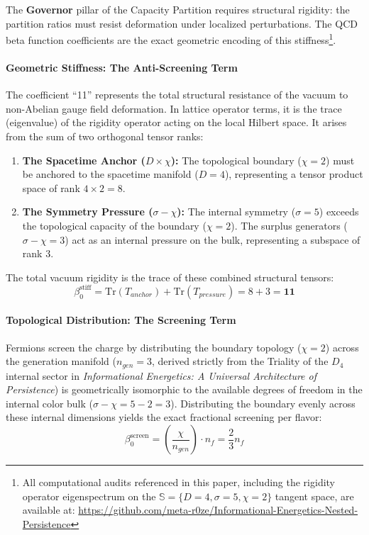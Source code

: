 The \textbf{Governor} pillar of the Capacity Partition requires structural rigidity: the partition ratios must resist deformation under localized perturbations. The QCD beta function coefficients are the exact geometric encoding of this stiffness\footnote{All computational audits referenced in this paper, including the rigidity operator eigenspectrum on the $\mathbb{S} = \{D=4, \sigma=5, \chi=2\}$ tangent space, are available at: \url{https://github.com/meta-r0ze/Informational-Energetics-Nested-Persistence}}.

\paragraph{Geometric Stiffness: The Anti-Screening Term}
The coefficient ``11'' represents the total structural resistance of the vacuum to non-Abelian gauge field deformation. In lattice operator terms, it is the trace (eigenvalue) of the rigidity operator acting on the local Hilbert space. It arises from the sum of two orthogonal tensor ranks:
\begin{enumerate}
    \item \textbf{The Spacetime Anchor ($D \times \chi$):} The topological boundary ($\chi=2$) must be anchored to the spacetime manifold ($D=4$), representing a tensor product space of rank $4 \times 2 = 8$.
    \item \textbf{The Symmetry Pressure ($\sigma - \chi$):} The internal symmetry ($\sigma=5$) exceeds the topological capacity of the boundary ($\chi=2$). The surplus generators ($\sigma - \chi = 3$) act as an internal pressure on the bulk, representing a subspace of rank $3$.
\end{enumerate}
The total vacuum rigidity is the trace of these combined structural tensors:
\begin{equation}
    \beta_0^{\text{stiff}} = \text{Tr}(T_{anchor}) + \text{Tr}(T_{pressure}) = 8 + 3 = \mathbf{11}
\end{equation}

\paragraph{Topological Distribution: The Screening Term}
Fermions screen the charge by distributing the boundary topology ($\chi=2$) across the generation manifold ($n_{gen}=3$, derived strictly from the Triality of the $D_4$ internal sector in \textit{Informational Energetics: A Universal Architecture of Persistence}\cite{meyer_informational_2026}) is geometrically isomorphic to the available degrees of freedom in the internal color bulk ($\sigma - \chi = 5 - 2 = 3$). Distributing the boundary evenly across these internal dimensions yields the exact fractional screening per flavor:
\begin{equation}
    \beta_0^{\text{screen}} = \left( \frac{\chi}{n_{gen}} \right) \cdot n_f = \frac{2}{3} n_f
\end{equation}

